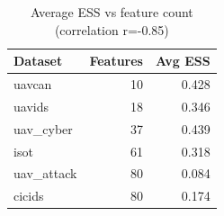 \begin{table}
\caption{Average ESS vs feature count (correlation r=-0.85)}
\label{tab:finding}
\begin{tabular}{lrr}
\toprule
Dataset & Features & Avg ESS \\
\midrule
uavcan & 10 & 0.428 \\
uavids & 18 & 0.346 \\
uav_cyber & 37 & 0.439 \\
isot & 61 & 0.318 \\
uav_attack & 80 & 0.084 \\
cicids & 80 & 0.174 \\
\bottomrule
\end{tabular}
\end{table}
